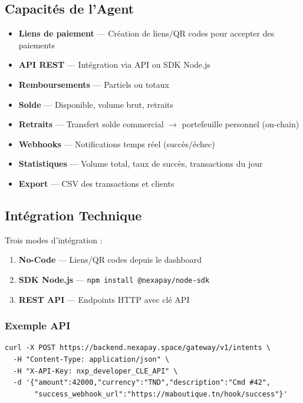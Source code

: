 \documentclass[11pt,a4paper]{article}
\begin{document}
\subsection{Capacit\'es de l'Agent}

\begin{itemize}[leftmargin=*]
    \item \textbf{Liens de paiement} --- Cr\'eation de liens/QR codes pour accepter des paiements
    \item \textbf{API REST} --- Int\'egration via API ou SDK Node.js
    \item \textbf{Remboursements} --- Partiels ou totaux
    \item \textbf{Solde} --- Disponible, volume brut, retraits
    \item \textbf{Retraits} --- Transfert solde commercial $\rightarrow$ portefeuille personnel (on-chain)
    \item \textbf{Webhooks} --- Notifications temps r\'eel (succ\`es/\'echec)
    \item \textbf{Statistiques} --- Volume total, taux de succ\`es, transactions du jour
    \item \textbf{Export} --- CSV des transactions et clients
\end{itemize}

\subsection{Int\'egration Technique}

Trois modes d'int\'egration :

\begin{enumerate}[leftmargin=*]
    \item \textbf{No-Code} --- Liens/QR codes depuis le dashboard
    \item \textbf{SDK Node.js} --- \texttt{npm install @nexapay/node-sdk}
    \item \textbf{REST API} --- Endpoints HTTP avec cl\'e API
\end{enumerate}

\subsubsection{Exemple API}

\begin{verbatim}
curl -X POST https://backend.nexapay.space/gateway/v1/intents \
  -H "Content-Type: application/json" \
  -H "X-API-Key: nxp_developer_CLE_API" \
  -d '{"amount":42000,"currency":"TND","description":"Cmd #42",
       "success_webhook_url":"https://maboutique.tn/hook/success"}'
\end{verbatim}
\end{document}
